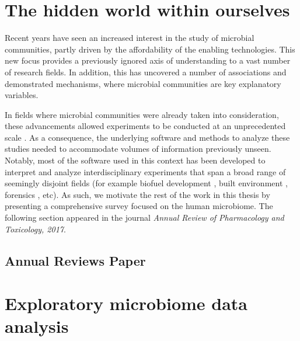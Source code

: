 \documentclass[12pt,chapterheads]{ucsd}
\begin{document}
%




\chapter{The hidden world within ourselves}\label{chapter_review}

Recent years have seen an increased interest in the study of microbial
communities, partly driven by the affordability of the enabling technologies.
This new focus provides a previously ignored axis of understanding to a vast
number of research fields. In addition, this has uncovered a number of
associations and demonstrated mechanisms, where microbial communities are key
explanatory variables.

In fields where microbial communities were already taken into consideration,
these advancements allowed experiments to be conducted at an unprecedented
scale \cite{RN35, RN4061, RN4267}. As a consequence, the underlying software
and methods to analyze these studies needed to accommodate volumes of
information previously unseen. Notably, most of the software used in this
context has been developed to interpret and analyze interdisciplinary
experiments that span a broad range of seemingly disjoint fields (for example
biofuel development \cite{RN4268}, built environment \cite{RN4270, RN4083},
forensics \cite{RN4269, RN4271}, etc).  As such, we motivate the rest of the
work in this thesis by presenting a comprehensive survey focused on the human 
microbiome.  The following section appeared in the journal
\textsl{Annual Review of Pharmacology and Toxicology, 2017}.

\ifdefined\RELEASE
    
\else
    \section{Annual Reviews Paper}
\fi

\chapter{Exploratory microbiome data analysis}\label{exploratory_chapter}
\end{document}
